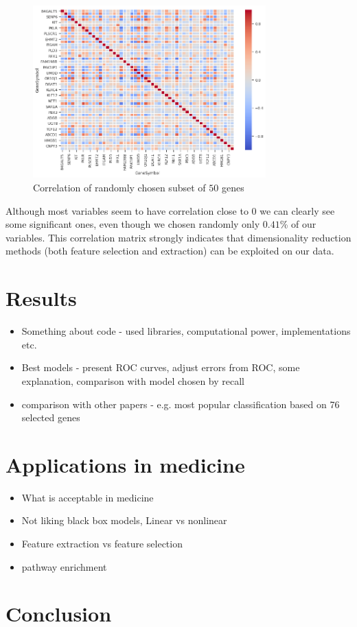\documentclass[12pt, wide]{mwart}
\begin{document}
\begin{figure}
\centering
\includegraphics[width=0.8\textwidth]{images/heatmap.png}
\caption{Correlation of randomly chosen subset of $50$ genes}
\label{fig:heatmap}
\end{figure}

Although most variables seem to have correlation close to $0$ we can clearly see some significant ones, even though we chosen randomly only $0.41$\% of our variables. This correlation matrix strongly indicates that dimensionality reduction methods (both feature selection and extraction) can be exploited on our data.

\section{Results}

\begin{itemize}
    \item Something about code - used libraries, computational power, implementations etc.
    \item Best models - present ROC curves, adjust errors from ROC, some explanation, comparison with model chosen by recall
    \item comparison with other papers - e.g. most popular classification based on 76 selected genes
\end{itemize}


\section{Applications in medicine} \label{section:application}

\begin{itemize}
    \item What is acceptable in medicine
    \item Not liking black box models, Linear vs nonlinear
    \item Feature extraction vs feature selection
    \item pathway enrichment
\end{itemize}

\section{Conclusion}



%
\end{document}
